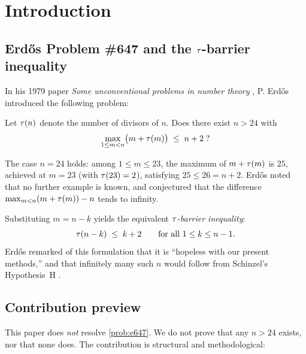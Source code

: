 
\section{Introduction}
\label{sec:intro}

\subsection{Erd\H{o}s Problem \#647 and the $\tau$-barrier inequality}

In his 1979 paper \emph{Some unconventional problems in number theory}
\cite{Erdos1979}, P. Erd\H{o}s introduced the following problem:

\begin{problem}[Erd\H{o}s \#647]
\label{prob:e647}
Let $\tau(n)$ denote the number of divisors of $n$. Does there exist
$n > 24$ with
\[
\max_{1 \le m < n} \bigl( m + \tau(m) \bigr) \;\le\; n + 2 \;?
\]
\end{problem}

The case $n = 24$ holds: among $1 \le m \le 23$, the maximum of
$m + \tau(m)$ is $25$, achieved at $m = 23$ (with $\tau(23) = 2$),
satisfying $25 \le 26 = n + 2$. Erd\H{o}s noted that no further
example is known, and conjectured that the difference
$\max_{m<n}(m + \tau(m)) - n$ tends to infinity.

Substituting $m = n - k$ yields the equivalent
\emph{$\tau$-barrier inequality}:
\[
\tau(n - k) \;\le\; k + 2 \qquad \text{for all } 1 \le k \le n - 1.
\]
Erd\H{o}s remarked of this formulation that it is ``hopeless with
our present methods,'' and that infinitely many such $n$ would
follow from Schinzel's Hypothesis~H \cite{SchinzelSierpinski1958}.

\subsection{Contribution preview}

This paper does \emph{not} resolve \cref{prob:e647}. We do not
prove that any $n > 24$ exists, nor that none does. The contribution
is structural and methodological:

